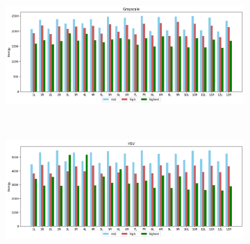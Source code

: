 \begin{figure}[H]
    \caption{Card STFT approach with Flattop window for Grayscale (a) and HSV (b) colourspaces.}
    \centering
    \begin{subfigure}{\textwidth}
        \centering
        \includegraphics[scale=0.5]{images/appendix/stft/card/flattop_Grayscale.png}
        \caption{}
    \end{subfigure}\\
    \begin{subfigure}{\textwidth}
         \centering
          \includegraphics[scale=0.5]{images/appendix/stft/card/flattop_HSV.png}
          \caption{}
    \end{subfigure}
    \fautor
\end{figure}


